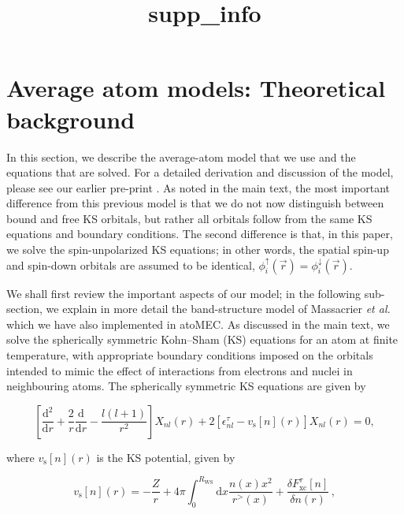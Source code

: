 \documentclass[11pt]{article}
\title{supp\_info}
\begin{document}
    
    \maketitle
    
    

    
    \hypertarget{average-atom-models-theoretical-background}{%
\section{Average atom models: Theoretical
background}\label{average-atom-models-theoretical-background}}

In this section, we describe the average-atom model that we use and the
equations that are solved. For a detailed derivation and discussion of
the model, please see our earlier pre-print
\cite{callow2021firstprinciples}. As noted in the main text, the most
important difference from this previous model is that we do not now
distinguish between bound and free KS orbitals, but rather all orbitals
follow from the same KS equations and boundary conditions. The second
difference is that, in this paper, we solve the spin-unpolarized KS
equations; in other words, the spatial spin-up and spin-down orbitals
are assumed to be identical,
\(\phi_i^\uparrow(\vec{r})=\phi_i^\downarrow(\vec{r})\).

We shall first review the important aspects of our model; in the
following sub-section, we explain in more detail the band-structure
model of Massacrier \emph{et al.} \cite{massacrier_bands} which we have
also implemented in atoMEC. As discussed in the main text, we solve the
spherically symmetric Kohn--Sham (KS) equations for an atom at finite
temperature, with appropriate boundary conditions imposed on the
orbitals intended to mimic the effect of interactions from electrons and
nuclei in neighbouring atoms. The spherically symmetric KS equations are
given by

\begin{equation}
\left[\frac{\textrm{d}^2}{\textrm{d}r} + \frac{2}{r}\frac{\textrm{d}}{\textrm{d}r} - \frac{l(l+1)}{r^2} \right] X_{nl}(r) + 2 \left[\epsilon^{\tau}_{nl} - v_\textrm{s}[n](r) \right] X_{nl}(r) = 0,
\end{equation}

where \(v_\textrm{s}[n](r)\) is the KS potential, given by

\begin{equation}
 v_{\textrm{s}}[n](r) = -\frac{Z}{r} + 4\pi \int_0^{R_\textrm{WS}} \textrm{d}{x} \frac{n(x)x^2}{r^>(x)} + \frac{\delta F_\textrm{xc}^\tau [n]}{\delta n(r)}\,,
\end{equation}
\end{document}
